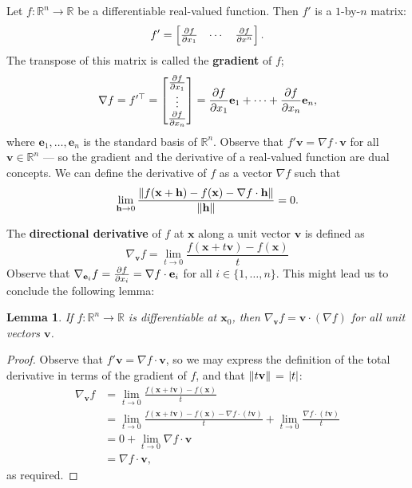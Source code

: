\documentclass[11pt]{article}
\renewcommand{\vec}[1]{\mathbf{#1}}
\renewcommand{\grad}{\nabla}
\newtheorem*{lemma*}{Lemma}
\begin{document}
Let $f : \mathbb{R}^{n} \to \mathbb{R}$ be a differentiable real-valued function. Then $f'$ is a $1$-by-$n$ matrix:
\[
	f' = \begin{bmatrix} \pdv{f}{x_{1}} & \cdots & \pdv{f}{x^{n}} \end{bmatrix}.
\]
The transpose of this matrix is called the \textbf{gradient} of $f$;
\[
	\grad f = f'^{\top} = \begin{bmatrix} \pdv{f}{x_{1}} \\ \vdots \\ \pdv{f}{x_{n}} \end{bmatrix} = \pdv{f}{x_{1}} \vec{e}_{1} + \cdots + \pdv{f}{x_{n}} \vec{e}_{n},
\]
where $\vec{e}_{1}, \ldots, \vec{e}_{n}$ is the standard basis of $\mathbb{R}^{n}$. Observe that $f' \vec{v} = \grad f \cdot \vec{v}$ for all $\vec{v} \in \mathbb{R}^{n}$ --- so the gradient and the derivative of a real-valued function are dual concepts. We can define the derivative of $f$ as a vector $\grad f$ such that 
\[
	\lim\limits_{\vec{h} \to 0} \frac{\norm{f(\vec{x} + \vec{h}) - f(\vec{x}) - \grad f \cdot \vec{h}}}{\norm{\vec{h}}} = 0.
\]

The \textbf{directional derivative} of $f$ at $\vec{x}$ along a unit vector $\vec{v}$ is defined as
\[
	\grad_{\vec{v}} f = \lim\limits_{t \to 0} \frac{f(\vec{x} + t \vec{v}) - f(\vec{x})}{t}
\]
Observe that $\grad_{\vec{e}_{i}} f = \pdv{f}{x_{i}} = \grad f \cdot \vec{e}_{i}$ for all $i \in \{ 1, \ldots, n \}$. This might lead us to conclude the following lemma:
\begin{adjustwidth}{0.5cm}{}
	\begin{lemma*}
		If $f: \mathbb{R}^{n} \to \mathbb{R}$ is differentiable at $\vec{x}_{0}$, then $\grad_{\vec{v}} f = \vec{v} \cdot (\grad f)$ for all unit vectors $\vec{v}$.
	\end{lemma*}
    \begin{proof}\renewcommand{\qedsymbol}{}
		Observe that $f' \vec{v} = \grad f \cdot \vec{v}$, so we may express the definition of the total derivative in terms of the gradient of $f$, and that $\norm{t \vec{v}}$ = $\abs{t}$:
		\begin{align*}
			\grad_{\vec{v}} f &= \lim\limits_{t \to 0} \frac{f(\vec{x} + t \vec{v}) - f(\vec{x})}{t} \\ 
			&= \lim\limits_{t \to 0} \frac{f(\vec{x} + t \vec{v}) - f(\vec{x}) - \grad f \cdot (t \vec{v})}{t} + \lim\limits_{t \to 0} \frac{\grad f \cdot (t \vec{v})}{t} \\
			&= 0 + \lim\limits_{t \to 0} \grad f \cdot \vec{v} \\
			&= \grad f \cdot \vec{v},
		\end{align*}
		as required.
	\end{proof}
\end{adjustwidth}
\end{document}
